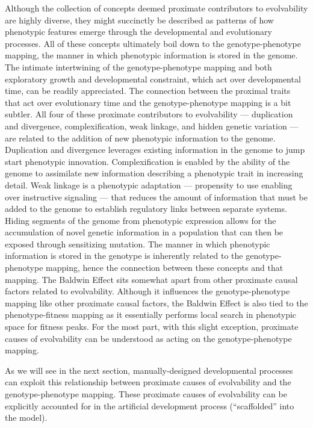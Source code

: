 Although the collection of concepts deemed proximate contributors to evolvability are highly diverse, they might succinctly be described as patterns of how phenotypic features emerge through the developmental and evolutionary processes.
All of these concepts ultimately boil down to the genotype-phenotype mapping, the manner in which phenotypic information is stored in the genome.
The intimate intertwining of the genotype-phenotype mapping and both exploratory growth and developmental constraint, which act over developmental time, can be readily appreciated.
The connection between the proximal traits that act over evolutionary time and the genotype-phenotype mapping is a bit subtler.
All four of these proximate contributors to evolvability --- duplication and divergence, complexification, weak linkage, and hidden genetic variation --- are related to the addition of new phenotypic information to the genome.
Duplication and divergence leverages existing information in the genome to jump start phenotypic innovation.
Complexification is enabled by the ability of the genome to assimilate new information describing a phenotypic trait in increasing detail.
Weak linkage is a phenotypic adaptation --- propensity to use enabling over instructive signaling --- that reduces the amount of information that must be added to the genome to establish regulatory links between separate systems.
Hiding segments of the genome from phenotypic expression allows for the accumulation of novel genetic information in a population that can then be exposed through sensitizing mutation.
The manner in which phenotypic information is stored in the genotype is inherently related to the genotype-phenotype mapping, hence the connection between these concepts and that mapping.
The Baldwin Effect sits somewhat apart from other proximate causal factors related to evolvability.
Although it influences the genotype-phenotype mapping like other proximate causal factors, the Baldwin Effect is also tied to the phenotype-fitness mapping as it essentially performs local search in phenotypic space for fitness peaks.
For the most part, with this slight exception, proximate causes of evolvability can be understood as acting on the genotype-phenotype mapping.

As we will see in the next section, manually-designed developmental processes can exploit this relationship between proximate causes of evolvability and the genotype-phenotype mapping. These proximate causes of evolvability can be explicitly accounted for in the artificial development process (``scaffolded'' into the model).

